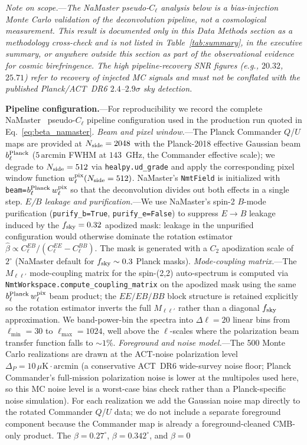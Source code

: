 \documentclass[aps,prd,twocolumn,superscriptaddress,showpacs,preprintnumbers,nofootinbib,longbibliography,floatfix]{revtex4-2}
\begin{document}
\noindent\textit{Note on scope.}---\emph{The NaMaster pseudo-$C_\ell$ analysis below is a bias-injection Monte Carlo validation of the deconvolution pipeline, not a cosmological measurement. This result is documented only in this Data Methods section as a methodology cross-check and is not listed in Table~\ref{tab:summary}, in the executive summary, or anywhere outside this section as part of the observational evidence for cosmic birefringence. The high pipeline-recovery SNR figures (e.g., $20.32$, $25.71$) refer to recovery of injected MC signals and \emph{must not} be conflated with the published Planck/ACT~DR6 $2.4$--$2.9\sigma$ sky detection.}

\noindent\textbf{Pipeline configuration.}---For reproducibility we record the complete NaMaster~\cite{Alonso2019} pseudo-$C_\ell$ pipeline configuration used in the production run quoted in Eq.~\eqref{eq:beta_namaster}. \emph{Beam and pixel window.}---The Planck Commander $Q$/$U$ maps are provided at $N_{\rm side}=2048$ with the Planck-2018 effective Gaussian beam $b_\ell^{\rm Planck}$ ($5\,\mathrm{arcmin}$ FWHM at $143$~GHz, the Commander effective scale); we degrade to $N_{\rm side}=512$ via \texttt{healpy.ud\_grade} and apply the corresponding pixel window function $w_\ell^{\rm pix}(N_{\rm side}=512)$. NaMaster's \texttt{NmtField} is initialized with \texttt{beam=}$b_\ell^{\rm Planck}\,w_\ell^{\rm pix}$ so that the deconvolution divides out both effects in a single step. \emph{$E$/$B$ leakage and purification.}---We use NaMaster's spin-2 $B$-mode purification (\texttt{purify\_b=True}, \texttt{purify\_e=False}) to suppress $E\!\to\!B$ leakage induced by the $f_{\rm sky}=0.32$ apodized mask: leakage in the unpurified configuration would otherwise dominate the rotation estimator $\hat\beta \propto C_\ell^{EB} / (C_\ell^{EE} - C_\ell^{BB})$. The mask is generated with a $C_2$ apodization scale of $2^\circ$ (NaMaster default for $f_{\rm sky}\sim 0.3$ Planck masks). \emph{Mode-coupling matrix.}---The $M_{\ell\ell'}$ mode-coupling matrix for the spin-(2,2) auto-spectrum is computed via \texttt{NmtWorkspace.compute\_coupling\_matrix} on the apodized mask using the same $b_\ell^{\rm Planck}\,w_\ell^{\rm pix}$ beam product; the $E\!E\!\!/\!E\!B\!\!/\!B\!B$ block structure is retained explicitly so the rotation estimator inverts the full $M_{\ell\ell'}$ rather than a diagonal $f_{\rm sky}$ approximation. We band-power-bin the spectra into $\Delta\ell=20$ linear bins from $\ell_{\min}=30$ to $\ell_{\max}=1024$, well above the $\ell$-scales where the polarization beam transfer function falls to $\sim 1\%$. \emph{Foreground and noise model.}---The 500 Monte Carlo realizations are drawn at the ACT-noise polarization level $\Delta_P = 10\,\mu\mathrm{K\!\cdot\!arcmin}$ (a conservative ACT~DR6 wide-survey noise floor; Planck Commander's full-mission polarization noise is lower at the multipoles used here, so this MC noise level is a worst-case bias check rather than a Planck-specific noise simulation). For each realization we add the Gaussian noise map directly to the rotated Commander $Q$/$U$ data; we do not include a separate foreground component because the Commander map is already a foreground-cleaned CMB-only product. The $\beta=0.27^\circ$, $\beta=0.342^\circ$, and $\beta=0$ 
\end{document}
